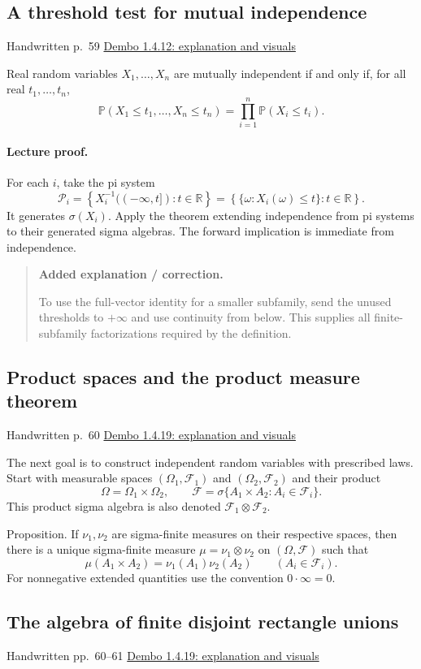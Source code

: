 \documentclass[11pt,letterpaper]{article}
\newcommand{\lecturesection}[1]{\subsection{#1}}
\begin{document}
\hypertarget{l7-s7}{}
\lecturesection{A threshold test for mutual independence}
{\small\textcolor{lectureink}{Handwritten p.\ 59} \quad \href{https://josephrbailey.com/probability/\#entry-1-4-12}{Dembo 1.4.12: explanation and visuals}}

Real random variables $X_1,\ldots,X_n$ are mutually independent if and only if, for all real $t_1,\ldots,t_n$, \[\mathbb P(X_1\le t_1,\ldots,X_n\le t_n)=\prod_{i=1}^n\mathbb P(X_i\le t_i).\]

\paragraph{Lecture proof.}
For each $i$, take the pi system \[\mathcal P_i=\left\{X_i^{-1}(({-\infty},t]):t\in\mathbb R\right\}=\left\{\{\omega:X_i(\omega)\le t\}:t\in\mathbb R\right\}.\] It generates $\sigma(X_i)$. Apply the theorem extending independence from pi systems to their generated sigma algebras. The forward implication is immediate from independence.

\begin{quote}\small\textbf{Added explanation / correction.}

To use the full-vector identity for a smaller subfamily, send the unused thresholds to $+\infty$ and use continuity from below. This supplies all finite-subfamily factorizations required by the definition.
\end{quote}

\hypertarget{l7-s8}{}
\lecturesection{Product spaces and the product measure theorem}
{\small\textcolor{lectureink}{Handwritten p.\ 60} \quad \href{https://josephrbailey.com/probability/\#entry-1-4-19}{Dembo 1.4.19: explanation and visuals}}

The next goal is to construct independent random variables with prescribed laws. Start with measurable spaces $(\Omega_1,\mathcal F_1)$ and $(\Omega_2,\mathcal F_2)$ and their product \[\Omega=\Omega_1\times\Omega_2,\qquad\mathcal F=\sigma\{A_1\times A_2:A_i\in\mathcal F_i\}.\] This product sigma algebra is also denoted $\mathcal F_1\otimes\mathcal F_2$.

Proposition. If $\nu_1,\nu_2$ are sigma-finite measures on their respective spaces, then there is a unique sigma-finite measure $\mu=\nu_1\otimes\nu_2$ on $(\Omega,\mathcal F)$ such that \[\mu(A_1\times A_2)=\nu_1(A_1)\nu_2(A_2)\qquad(A_i\in\mathcal F_i).\] For nonnegative extended quantities use the convention $0\cdot\infty=0$.

\hypertarget{l7-s9}{}
\lecturesection{The algebra of finite disjoint rectangle unions}
{\small\textcolor{lectureink}{Handwritten pp.\ 60--61} \quad \href{https://josephrbailey.com/probability/\#entry-1-4-19}{Dembo 1.4.19: explanation and visuals}}
\end{document}
